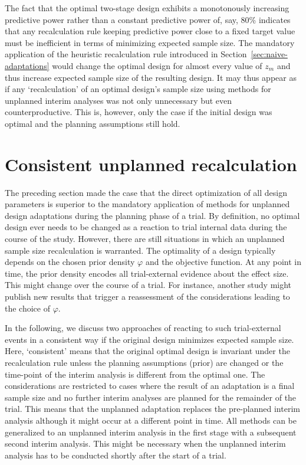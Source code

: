 \documentclass[12pt]{article}
\begin{document}
The fact that the optimal two-stage design exhibits a monotonously increasing
predictive power rather than a constant predictive power of, say, 80\%
indicates that any recalculation rule keeping predictive power
close to a fixed target value must be inefficient in terms of minimizing expected sample size.
The mandatory application of the heuristic recalculation rule introduced in Section~\ref{sec:naive-adaptations} would change the optimal design for almost every value of $z_m$ and thus increase expected sample size
of the resulting design.
It may thus appear as if any `recalculation' of an optimal design's sample size using methods
for unplanned interim analyses was not only
unnecessary but even counterproductive.
This is, however, only the case if the initial design was optimal and
the planning assumptions still hold.


\section{Consistent unplanned recalculation}
\label{sec:unplanned-adaptation}

The preceding section made the case that the direct optimization of all design parameters is superior to the mandatory application of methods for unplanned design adaptations during the planning phase of a trial.
By definition,
no optimal design ever needs to be changed as a reaction to trial internal data during the course of the study.
However, there are still situations in which an unplanned sample size recalculation is warranted.
The optimality of a design typically depends on the chosen prior density $\varphi$ and the objective function.
At any point in time,
the prior density encodes all trial-external evidence
about the effect size.
This might change over the course of a trial.
For instance, another study might publish new results that trigger a reassessment of the considerations leading to the choice of $\varphi$.

In the following, we discuss two approaches of reacting to such trial-external events in a consistent way
if the original design minimizes expected sample size.
Here, `consistent' means that the original optimal design is invariant under
the recalculation rule unless the planning assumptions (prior) are changed or
the time-point of the interim analysis is different from the optimal one.
The considerations are restricted to cases where the result of an adaptation is a final sample size and no further interim analyses are planned for the remainder of the trial.
This means that the unplanned adaptation replaces the pre-planned interim analysis although it might occur at a different point in time.
All methods can be generalized to an unplanned interim analysis in the
first stage with a subsequent second interim analysis.
This might be necessary when the unplanned interim analysis has to
be conducted shortly after the start of a trial.
\end{document}
